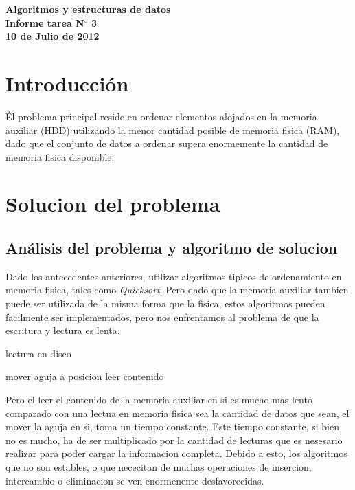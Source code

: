 \documentclass[11pt]{article}
\begin{document}
\logo

\vspace{-2mm}
\begin{center}
\bf Algoritmos y estructuras de datos\\
\large Informe tarea N$^\circ$ 3\\
\vspace{1mm}
\small\bf 10 de Julio de 2012
\end{center}
\vspace{-2mm}


\section{Introducción}
Él problema principal reside en ordenar elementos alojados en la memoria auxiliar (HDD) utilizando la menor cantidad posible de memoria fisica (RAM), dado que el conjunto de datos a ordenar supera enormemente la cantidad de memoria fisica disponible.

\section{Solucion del problema}
	\subsection{Análisis del problema y algoritmo de solucion}
		Dado los antecedentes anteriores, utilizar algoritmos tipicos de ordenamiento en memoria fisica, tales como \textit{Quicksort}. Pero dado que la memoria auxiliar tambien puede ser utilizada de la misma forma que la fisica, estos algoritmos pueden facilmente ser implementados, pero nos enfrentamos al problema de que la escritura y lectura es lenta.
		
		\begin{algorithm}[H]
		\caption{lectura en disco}
		\label{alg_lecturaDisco}
		\begin{algorithmic}   
			\STATE mover aguja a posicion
			\STATE leer contenido
		\end{algorithmic}
		\end{algorithm}
	
	Pero el leer el contenido de la memoria auxiliar en si es mucho mas lento comparado con una lectua en memoria fisica sea la cantidad de datos que sean, el mover la aguja en si, toma un tiempo constante. Este tiempo constante, si bien no es mucho, ha de ser multiplicado por la cantidad de lecturas que es nesesario realizar para poder cargar la informacion completa. Debido a esto, los algoritmos que no son estables, o que nececitan de muchas operaciones de insercion, intercambio o eliminacion se ven enormenente desfavorecidas.
	
\end{document}
